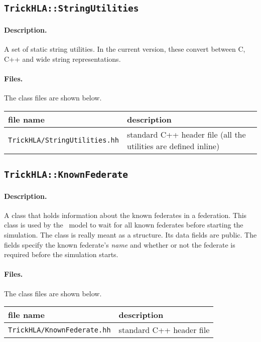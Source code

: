 \subsection{{\tt TrickHLA::StringUtilities}}

\paragraph{Description.}
A set of static string utilities.
In the current version, these convert between C, C++ and wide
string representations.

\paragraph{Files.}
The class files are shown below.
   
{
  \scriptsize
  \begin{tabular}{|l|l|} 
    \hline
    file name & description \\
    \hline \hline
    {\tt TrickHLA/StringUtilities.hh} 
    & standard C++ header file
      (all the utilities are defined inline)
    \\ \hline
  \end{tabular}
}

\subsection{{\tt TrickHLA::KnownFederate}}

\paragraph{Description.}
A class that holds information about the known federates in a federation.
This class is used by the \TrickHLA\ model to wait for all known federates
before starting the simulation.
The class is really meant as a structure.  Its data fields are public.
The fields specify the known federate's {\em name} and whether or not
the federate is required before the simulation starts.

\paragraph{Files.}
The class files are shown below.
   
{
  \scriptsize
  \begin{tabular}{|l|l|} 
    \hline
    file name & description \\
    \hline \hline
    {\tt TrickHLA/KnownFederate.hh} 
    & standard C++ header file
    \\ \hline
  \end{tabular}
}

